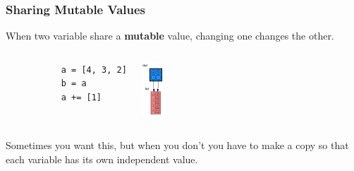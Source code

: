 \documentclass[10pt, colorlinks=true, urlcolor=blue]{beamer}
\begin{document}
\begin{frame}[fragile]
  \frametitle {Sharing Mutable Values}
  When two variable share a \textbf{mutable} value, changing one changes the other.
  \vspace{1em}
\begin{columns}
  \begin{verbatim}
           a = [4, 3, 2]
           b = a
           a += [1]
    \end{verbatim}
    \begin{center}\includegraphics[width=0.25\textwidth]{figures/sharing.png}\end{center}
\end{columns}
\vspace{1em}
Sometimes you want this, but when you don't you have to make a copy so that each variable has its own independent value.
\end{frame}
\end{document}
